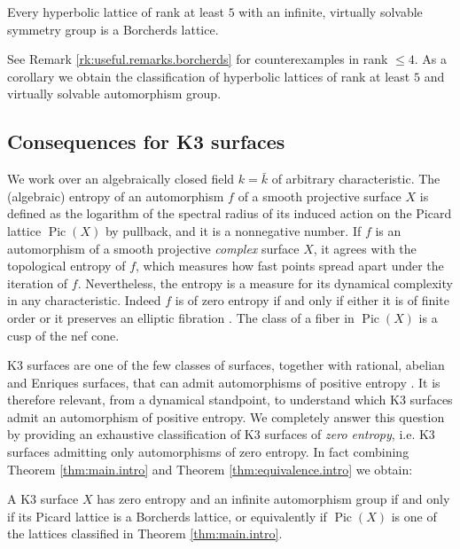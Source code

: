 \documentclass[11pt,letterpaper]{amsart}
\DeclareMathOperator{\Pic}{Pic}
\begin{document}
\begin{theorem}\label{thm:virtualy-solvable5}
Every hyperbolic lattice of rank at least $5$ with an infinite, virtually solvable symmetry group is a Borcherds lattice.
\end{theorem}
See Remark \ref{rk:useful.remarks.borcherds} for counterexamples in rank $\le 4$. As a corollary we obtain the  classification of hyperbolic lattices of rank at least $5$ and virtually solvable automorphism group.

\subsection{Consequences for K3 surfaces}
We work over an algebraically closed field $k=\bar k$ of arbitrary characteristic.
The (algebraic) entropy of an automorphism $f$ of a smooth projective surface $X$ is defined as the logarithm of the spectral radius of its induced action on the Picard lattice $\Pic(X)$ by pullback, and it is a nonnegative number. If $f$ is an automorphism of a smooth projective \emph{complex} surface $X$, it agrees with the topological entropy of $f$, which measures how fast points spread apart under the iteration of $f$.
Nevertheless, the entropy is a measure for its dynamical complexity in any characteristic.
Indeed $f$ is of zero entropy if and only if either it is of finite order or it preserves an elliptic fibration \cite[Thm. 2.11,\S 2.4.5]{cantat:dynamics_of_compact_complex}. The class of a fiber in $\Pic(X)$ is a cusp of the nef cone.

K3 surfaces are one of the few classes of surfaces, together with rational, abelian and Enriques surfaces, that can admit automorphisms of positive entropy \cite{cantat.dynamics.K3.1,cantat.dynamics.K3.2}. It is therefore relevant, from a dynamical standpoint, to understand which K3 surfaces admit an automorphism of positive entropy. 
We completely answer this question by providing an exhaustive classification of K3 surfaces of \emph{zero entropy}, i.e. K3 surfaces admitting only automorphisms of zero entropy. In fact combining Theorem \ref{thm:main.intro} and Theorem \ref{thm:equivalence.intro} we obtain:

\begin{corollary} \label{cor:main.intro.K3}
A K3 surface $X$ has zero entropy and an infinite automorphism group if and only if its Picard lattice is a Borcherds lattice, or equivalently if $\Pic(X)$ is one of the lattices classified in Theorem \ref{thm:main.intro}.
\end{corollary}
\end{document}
